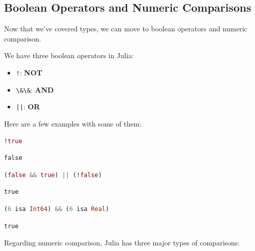 \documentclass[
  notoc %
]{tufte-book}
\providecommand{\tightlist}{%
  \setlength{\itemsep}{0pt}\setlength{\parskip}{0pt}
}
\newcommand{\passthrough}[1]{#1}
\begin{document}
\hypertarget{boolean-operators-and-numeric-comparisons}{%
\subsection{Boolean Operators and Numeric
Comparisons}\label{boolean-operators-and-numeric-comparisons}}

Now that we've covered types, we can move to boolean operators and
numeric comparison.

We have three boolean operators in Julia:

\begin{itemize}
\tightlist
\item
  \passthrough{\lstinline"!"}: \textbf{NOT}
\item
  \passthrough{\lstinline!\&\&!}: \textbf{AND}
\item
  \passthrough{\lstinline!||!}: \textbf{OR}
\end{itemize}

Here are a few examples with some of them:

\begin{lstlisting}[language=Julia]
!true
\end{lstlisting}

\begin{lstlisting}[language=Output]
false
\end{lstlisting}

\begin{lstlisting}[language=Julia]
(false && true) || (!false)
\end{lstlisting}

\begin{lstlisting}[language=Output]
true
\end{lstlisting}

\begin{lstlisting}[language=Julia]
(6 isa Int64) && (6 isa Real)
\end{lstlisting}

\begin{lstlisting}[language=Output]
true
\end{lstlisting}

Regarding numeric comparison, Julia has three major types of
comparisons:
\end{document}
